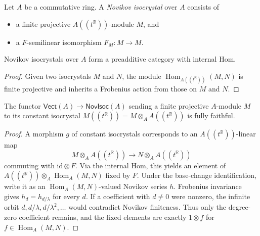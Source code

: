 \begin{definition}
  \label{def:novikov_isocrystal}
  \leanok
  Let $A$ be a commutative ring. A \emph{Novikov isocrystal} over $A$ consists of
  \begin{itemize}
    \item a finite projective $A((t^{\mathbb{R}}))$-module $M$, and
    \item a $F$-semilinear isomorphism $F_M \colon M \to M$.
  \end{itemize}
\end{definition}

\begin{lemma}
  \label{lem:novikov_isocrystal_category}
  \leanok
  Novikov isocrystals over $A$ form a preadditive category with internal Hom.
\end{lemma}

\begin{proof}
  \leanok
  Given two isocrystals $M$ and $N$, the module
  $\operatorname{Hom}_{A((t^{\mathbb{R}}))}(M, N)$ is finite projective and
  inherits a Frobenius action from those on $M$ and $N$.
\end{proof}

\begin{theorem}
  \label{thm:vect_to_isoc_full_faith}
  \leanok
  The functor $\mathsf{Vect}(A)\to\mathsf{NovIsoc}(A)$ sending a finite
  projective $A$-module $M$ to its constant isocrystal
  $M((t^{\mathbb{R}}))=M\otimes_A A((t^{\mathbb{R}}))$ is fully faithful.
\end{theorem}

\begin{proof}
  \leanok
  A morphism $g$ of constant isocrystals corresponds to an
  $A((t^{\mathbb{R}}))$-linear map
  \[
    M\otimes_A A((t^{\mathbb{R}}))
      \longrightarrow N\otimes_A A((t^{\mathbb{R}}))
  \]
  commuting with $\mathrm{id}\otimes F$.  Via the internal Hom, this yields an
  element of
  $A((t^{\mathbb{R}}))\otimes_A\operatorname{Hom}_A(M,N)$ fixed by $F$.
  Under the base-change identification, write it as an
  $\operatorname{Hom}_A(M,N)$-valued Novikov series $h$.  Frobenius invariance
  gives $h_d=h_{d/\lambda}$ for every $d$.  If a coefficient with $d\ne0$ were
  nonzero, the infinite orbit $d,d/\lambda,d/\lambda^2,\ldots$ would contradict
  Novikov finiteness.  Thus only the degree-zero coefficient remains, and the
  fixed elements are exactly $1\otimes f$ for
  $f\in\operatorname{Hom}_A(M,N)$.
\end{proof}

